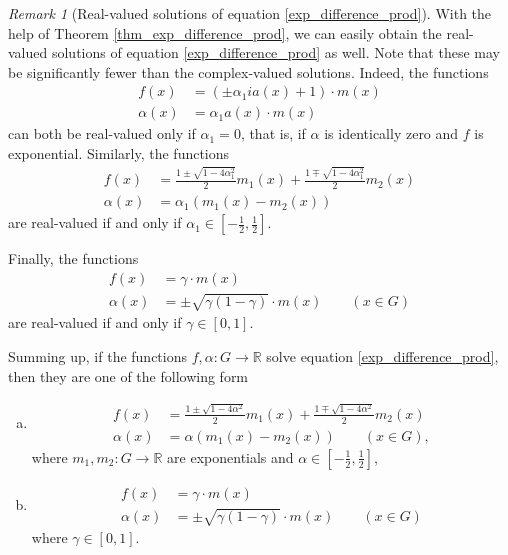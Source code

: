 \documentclass[a4paper,12pt]{article}
\theoremstyle{plain}
\theoremstyle{definition}
\theoremstyle{remark}
\newtheorem*{rem}{Remark}
\begin{document}
\begin{rem}[Real-valued solutions of equation \eqref{exp_difference_prod}]
With the help of Theorem \ref{thm_exp_difference_prod}, we can easily obtain the real-valued solutions of equation \eqref{exp_difference_prod} as well. Note that these may be significantly fewer than the complex-valued solutions. Indeed, the functions 
\begin{align*}
  f(x)&= \left(\pm \alpha_{1} i a(x)+1\right)\cdot m(x)\\
  \alpha(x)&= \alpha_{1}a(x)\cdot m(x)  
 \end{align*}
can both be real-valued only if $\alpha_1 = 0$, that is, if $\alpha$ is identically zero and $f$ is exponential.
Similarly, the functions 
 \begin{align*}
 f(x)&= \frac{1\pm \sqrt{1-4\alpha_{1}^2}}{2} m_{1}(x) + \frac{1\mp \sqrt{1-4\alpha_{1}^2}}{2} m_{2}(x)\\
 \alpha(x)&= \alpha_{1}(m_{1}(x)-m_{2}(x))
\end{align*}
are real-valued if and only if $\alpha_{1}\in \left[-\frac{1}{2}, \frac{1}{2}\right]$. 

Finally, the functions 
\begin{align*}
 f(x)&= \gamma \cdot m(x)\\
 \alpha(x)&= \pm\sqrt{\gamma(1-\gamma)}\cdot m(x)
 \qquad 
 \left(x\in G\right)
 \end{align*}
 are real-valued if and only if $\gamma \in [0, 1]$. 
 
 Summing up, if the functions $f, \alpha \colon G\to \mathbb{R}$ solve equation \eqref{exp_difference_prod}, then they are one of the following form
 \begin{enumerate}[(a)]
  \item \begin{align*}
 f(x)&= \frac{1\pm \sqrt{1-4\alpha^2}}{2} m_{1}(x) + \frac{1\mp \sqrt{1-4\alpha^2}}{2} m_{2}(x)\\
 \alpha(x)&= \alpha(m_{1}(x)-m_{2}(x)) 
 \qquad 
 \left(x\in G\right), 
\end{align*}
where $m_{1}, m_{2}\colon G\to \mathbb{R}$ are exponentials and $\alpha \in \left[-\frac{1}{2}, \frac{1}{2}\right]$, 
\item   \begin{align*}
 f(x)&= \gamma \cdot m(x)\\
 \alpha(x)&= \pm\sqrt{\gamma(1-\gamma)}\cdot m(x)
 \qquad 
 \left(x\in G\right)
 \end{align*}
where $\gamma \in [0, 1]$. 
\end{enumerate}
\end{rem}
\end{document}
